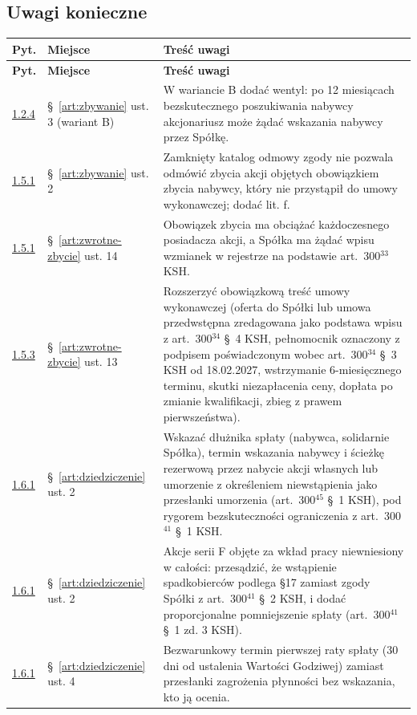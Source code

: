 \documentclass[12pt,a4paper]{report}
\begin{document}
\subsection*{Uwagi konieczne}
\begin{longtable}{@{}p{1.3cm} p{3.3cm} p{9.6cm}@{}}
\toprule
\textbf{Pyt.} & \textbf{Miejsce} & \textbf{Treść uwagi} \\
\midrule
\endfirsthead
\toprule
\textbf{Pyt.} & \textbf{Miejsce} & \textbf{Treść uwagi} \\
\midrule
\endhead
\hyperref[memo:1.2.4]{1.2.4} & §~\ref{art:zbywanie} ust. 3 (wariant B) & W wariancie B dodać wentyl: po 12 miesiącach bezskutecznego poszukiwania nabywcy akcjonariusz może żądać wskazania nabywcy przez Spółkę. \\
\hyperref[memo:1.5.1]{1.5.1} & §~\ref{art:zbywanie} ust. 2 & Zamknięty katalog odmowy zgody nie pozwala odmówić zbycia akcji objętych obowiązkiem zbycia nabywcy, który nie przystąpił do umowy wykonawczej; dodać lit. f. \\
\hyperref[memo:1.5.1]{1.5.1} & §~\ref{art:zwrotne-zbycie} ust. 14 & Obowiązek zbycia ma obciążać każdoczesnego posiadacza akcji, a Spółka ma żądać wpisu wzmianek w rejestrze na podstawie art.~300$^{33}$ KSH. \\
\hyperref[memo:1.5.3]{1.5.3} & §~\ref{art:zwrotne-zbycie} ust. 13 & Rozszerzyć obowiązkową treść umowy wykonawczej (oferta do Spółki lub umowa przedwstępna zredagowana jako podstawa wpisu z art.~300$^{34}$ §~4 KSH, pełnomocnik oznaczony z podpisem poświadczonym wobec art.~300$^{34}$ §~3 KSH od 18.02.2027, wstrzymanie 6-miesięcznego terminu, skutki niezapłacenia ceny, dopłata po zmianie kwalifikacji, zbieg z prawem pierwszeństwa). \\
\hyperref[memo:1.6.1]{1.6.1} & §~\ref{art:dziedziczenie} ust. 2 & Wskazać dłużnika spłaty (nabywca, solidarnie Spółka), termin wskazania nabywcy i ścieżkę rezerwową przez nabycie akcji własnych lub umorzenie z określeniem niewstąpienia jako przesłanki umorzenia (art.~300$^{45}$ §~1 KSH), pod rygorem bezskuteczności ograniczenia z art.~300$^{41}$ §~1 KSH. \\
\hyperref[memo:1.6.1]{1.6.1} & §~\ref{art:dziedziczenie} ust. 2 & Akcje serii F objęte za wkład pracy niewniesiony w całości: przesądzić, że wstąpienie spadkobierców podlega §17 zamiast zgody Spółki z art.~300$^{41}$ §~2 KSH, i dodać proporcjonalne pomniejszenie spłaty (art.~300$^{41}$ §~1 zd. 3 KSH). \\
\hyperref[memo:1.6.1]{1.6.1} & §~\ref{art:dziedziczenie} ust. 4 & Bezwarunkowy termin pierwszej raty spłaty (30 dni od ustalenia Wartości Godziwej) zamiast przesłanki zagrożenia płynności bez wskazania, kto ją ocenia. \\

\end{longtable}
\end{document}
